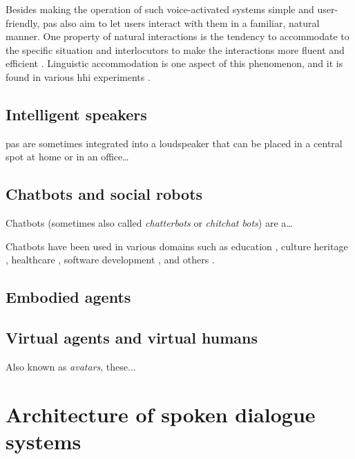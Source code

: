 Besides making the operation of such voice-activated systems simple and user-friendly, \acp{pa} also aim to let users interact with them in a familiar, natural manner.
One property of natural interactions is the tendency to accommodate to the specific situation and interlocutors to make the interactions more fluent and efficient \citep{Giles1991CAT,Gallois2015CAT}.
Linguistic accommodation is one aspect of this phenomenon, and it is found in various \ac{hhi} experiments \citep[e.g.,][]{Pardo2017phonetic,Schweitzer2017social}.

\subsection{Intelligent speakers}
\label{subsec:intelligent_speakers}

\Acp{pa} are sometimes integrated into a loudspeaker that can be placed in a central spot at home or in an office\ldots

\subsection{Chatbots and social robots}
\label{subsec:chatbots}

Chatbots (sometimes also called \emph{chatterbots} or \emph{chitchat bots}) are a\ldots


Chatbots have been used in various domains such as education \citep{Benotti2014engaging, Kerly2007bringing}, culture heritage \citep{Pilato2005expert}, healthcare \citep{Kowatsch2017text}, software development \citep{Lebeuf2017software}, and others \citep{Shawar2007chatbots}.

\subsection{Embodied agents}
\label{subsec:embodied_agents}

\citet{Staum2010virtually, Gijssels2016speech}

\subsection{Virtual agents and virtual humans}
\label{subsec:virtual_agents}

Also known as \textit{avatars}, these...

\section{Architecture of spoken dialogue systems}
\label{sec:architecture_sds}


